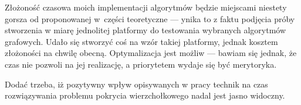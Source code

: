 \begin{note}
  Złożoność czasowa moich implementacji algorytmów będzie miejscami niestety
  gorsza od proponowanej w~części teoretyczne --- ynika to z faktu podjęcia
  próby stworzenia w miarę jednolitej platformy do testowania wybranych
  algorytmów grafowych.
  Udało się stworzyć coś na wzór takiej platformy, jednak kosztem złożoności na
  chwilę obecną.
  Optymalizacja jest możliw --- bawiam się jednak, że czas nie pozwoli na jej
  realizację, a priorytetem wydaje się być merytoryka.

  Dodać trzeba, iż pozytywny wpływ opisywanych w pracy technik na czas
  rozwiązywania problemu pokrycia wierzchołkowego nadal jest jasno widoczny.
\end{note}
